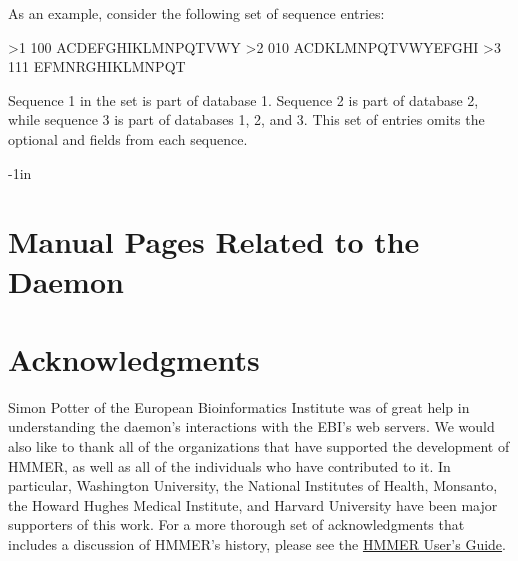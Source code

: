 \documentclass[notoc,justified]{tufte-book}    %
\begin{document}
As an example, consider the following set of sequence entries:

\begin{sreoutput}
>1 100
ACDEFGHIKLMNPQTVWY
>2 010
ACDKLMNPQTVWYEFGHI
>3 111
EFMNRGHIKLMNPQT
\end{sreoutput}

Sequence 1 in the set is part of database 1.  Sequence 2 is part of database 2, while sequence 3 is part of databases 1, 2, and 3.  This set of entries omits the optional  and  fields from each sequence.




\begin{adjustwidth}{}{-1in}   
\chapter{Manual Pages Related to the Daemon}

\end{adjustwidth}

\chapter{Acknowledgments}
Simon Potter of the European Bioinformatics Institute was of great help in understanding the daemon's interactions with the EBI's web servers.  We would also like to thank all of the organizations that have supported the development of HMMER, as well as all of the individuals who have contributed to it. In particular, Washington University, the National Institutes of Health, Monsanto, the Howard Hughes Medical Institute, and Harvard University have been major supporters of this work.  For a more thorough set of acknowledgments that includes a discussion of HMMER's history, please see the \underline{HMMER User's Guide}.

\label{manualend}

% 
\end{document}
